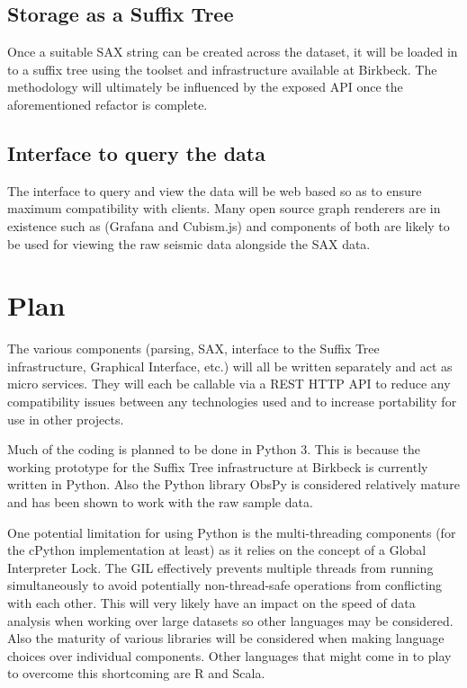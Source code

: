 \documentclass[11pt]{scrartcl}
\begin{document}
\subsection{Storage as a Suffix Tree}
	Once a suitable SAX string can be created across the dataset, it will be loaded in to a suffix tree using the toolset and infrastructure available at Birkbeck.  The methodology will ultimately be influenced by the exposed API once the aforementioned refactor is complete.

\subsection{Interface to query the data}
	The interface to query and view the data will be web based so as to ensure maximum compatibility with clients.  Many open source graph renderers are in existence such as (Grafana and Cubism.js) and components of both are likely to be used for viewing the raw seismic data alongside the SAX data.

\section{Plan}
	The various components (parsing, SAX, interface to the Suffix Tree infrastructure, Graphical Interface, etc.) will all be written separately and act as micro services.  They will each be callable via a REST HTTP API to reduce any compatibility issues between any technologies used and to increase portability for use in other projects.

	Much of the coding is planned to be done in Python 3.  This is because the working prototype for the Suffix Tree infrastructure at Birkbeck is currently written in Python.  Also the Python library ObsPy is considered relatively mature and has been shown to work with the raw sample data.
	
	One potential limitation for using Python is the multi-threading components (for the cPython implementation at least) as it relies on the concept of a Global Interpreter Lock.  The GIL effectively prevents multiple threads from running simultaneously to avoid potentially non-thread-safe operations from conflicting with each other.  This will very likely have an impact on the speed of data analysis when working over large datasets so other languages may be considered.  Also the maturity of various libraries will be considered when making language choices over individual components.  Other languages that might come in to play to overcome this shortcoming are R and Scala.
	
\end{document}
